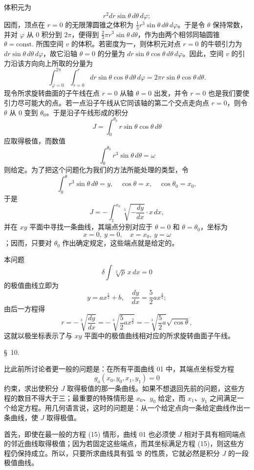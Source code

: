 \documentclass[11pt,a4paper,leqno]{article}
\begin{document}
体积元为
\[
r^2dr\sin\theta\,d\theta\,d\varphi;
\]
因而，顶点在 $r=0$ 的无限薄圆锥之体积为 $\frac13 r^3\sin\theta\,d\theta\,d\varphi$。于是令 $\theta$ 保持常数，并对 $\varphi$ 从 0 积分到 $2\pi$，便得到 $\frac23\pi r^3\sin\theta\,d\theta$，作为由两个相邻同轴圆锥 $\theta=\mathrm{const.}$ 所围空间 $v$ 的体积。若密度为一，则体积元对点 $r=0$ 的牛顿引力为 $dr\sin\theta\,d\theta\,d\varphi$，故它沿轴 $\theta=0$ 的分量为 $dr\sin\theta\cos\theta\,d\theta\,d\varphi$。因此，空间 $v$ 的引力沿该方向向上所取的分量为
\[
\int_{\varphi=0}^{2\pi}\int_{r=0}^{r}dr\sin\theta\cos\theta\,d\theta\,d\varphi=2\pi r\sin\theta\cos\theta\,d\theta.
\]
现令所求旋转曲面的子午线在点 $r=0$ 从轴 $\theta=0$ 出发，并令 $r=0$ 也是我们要使引力尽可能大的点。若一点沿子午线从它同该轴的第二个交点走向点 $r=0$，则令 $\theta$ 从 0 变到 $\theta_0$。于是沿子午线形成的积分
\[
J=\int_0^{\theta_0} r\sin\theta\cos\theta\,d\theta
\]
应取得极值，而数值
\[
\int_0^{\theta_0} r^3\sin\theta\,d\theta=\omega
\]
则给定。为了把这个问题化为我们的方法所能处理的类型，令
\[
\int_0^\theta r^3\sin\theta\,d\theta=y,
\quad \cos\theta=x,
\quad \cos\theta_0=x_0,
\]
于是
\[
J=-\int_1^{x_0}\sqrt[3]{-\frac{dy}{dx}}\cdot x\,dx,
\]
并在 $xy$ 平面中寻找一条曲线，其端点分别对应于 $\theta=0$ 和 $\theta=\theta_0$，坐标为
\[
x=0,\ y=0,\quad x=x_0,\ y=\omega
\]
；因而，只要对 $\theta_0$ 作出确定规定，这些端点就是给定的。

本问题
\[
\delta\int \sqrt[3]{p}\,x\,dx=0
\]
的极值曲线立即为
\[
y=ax^{\frac52}+b,\quad \frac{dy}{dx}=\frac52 ax^{\frac32};
\]
由后一方程得
\[
r=-\sqrt[3]{\frac{dy}{dx}}=-\sqrt[3]{\frac52 ax^{\frac32}}=-\sqrt[3]{\frac52a}\sqrt{\cos\theta},
\]
这就以极坐标表示了与 $xy$ 平面中的极值曲线相对应的所求旋转曲面子午线。

\begin{center}{\large \S~10.}\end{center}

比此前所讨论者更一般的问题是：在所有平面曲线 01 中，其端点坐标受方程
\begin{equation}\tag{15}
g_a(x_0,y_0,x_1,y_1)=0
\end{equation}
约束，求出使积分 $J$ 取得极值的那一条曲线。如果不想退回先前的问题，这些方程的数目不得大于三；最重要的特殊情形是 $x_0$、$y_0$ 给定，而 $x_1$、$y_1$ 之间满足一个给定方程。用几何语言说，这时的问题是：从一个给定点向一条给定曲线作出一条曲线，使 $J$ 取得极值。

首先，即使在最一般的方程 (15) 情形，曲线 01 也必须使 $J$ 相对于具有相同端点的邻近曲线取得极值；因为若固定这些端点，而其坐标满足方程 (15)，则这些方程仍保持成立。所以，只要所求曲线具有弧 $\mathfrak{B}$ 的性质，它就必然是积分 $J$ 的一段极值曲线。
\end{document}
